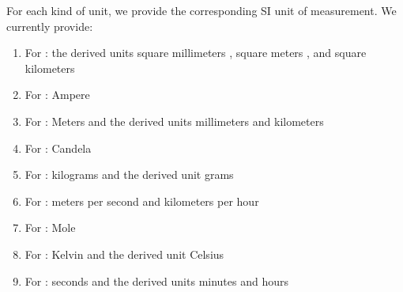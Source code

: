 \begin{description}
\item[]

\item[]

\item[]

\item[]

\item[]

\item[]

\item[]

\item[]

\item[]
\end{description}

\medskip


For each kind of unit, we provide the corresponding SI unit of
measurement.
We currently provide:

\begin{enumerate}
\item For :
  the derived units
  square millimeters ,
  square meters , and
  square kilometers 

\item For :
  Ampere 

\item For :
  Meters 
  and the derived units
  millimeters  and
  kilometers 

\item For :
  Candela 

\item For :
  kilograms 
  and the derived unit
  grams 

\item For :
  meters per second  and
  kilometers per hour 

\item For :
  Mole 

\item For :
  Kelvin 
  and the derived unit
  Celsius 

\item For :
  seconds 
  and the derived units
  minutes  and
  hours 
\end{enumerate}


